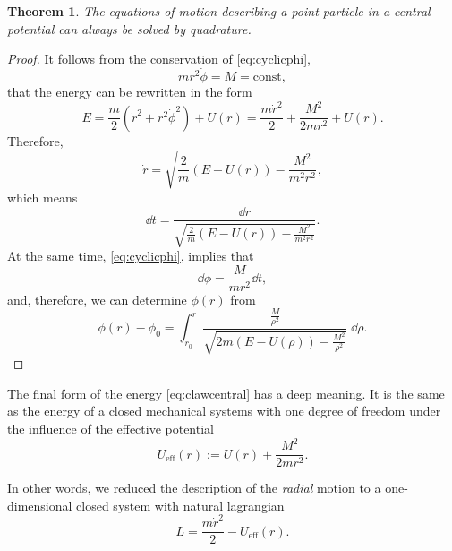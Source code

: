\documentclass[english,fontsize=11pt,paper=b5]{scrbook}
\numberwithin{equation}{chapter}
\newtheorem{theorem}{Theorem}[chapter]
\theoremstyle{definition}
\begin{document}
    \begin{theorem}
      The equations of motion describing a point particle in a central potential can always be solved by quadrature.
    \end{theorem}
    \begin{proof}
      It follows from the conservation of \eqref{eq:cyclicphi},
      \begin{equation}\label{eq:cyclicphi1}
        m r^2 \dot \phi = M = \mathrm{const},
      \end{equation}
      that the energy can be rewritten in the form
      \begin{equation}\label{eq:clawcentral}
        E = \frac m2 \left(\dot r^2 + r^2 \dot \phi^2\right) + U(r)
        = \frac {m \dot r^2}2 + \frac{M^2}{2m r^2} + U(r).
      \end{equation}
      Therefore,
      \begin{equation}
        \dot r = \sqrt{\frac2m(E-U(r)) - \frac{M^2}{m^2 r^2}},
      \end{equation}
      which means
      \begin{equation}\label{eq:timedep}
        \dd t = \frac{\dd r}{\sqrt{\frac2m(E-U(r)) - \frac{M^2}{m^2 r^2}}}.
      \end{equation}
      At the same time, \eqref{eq:cyclicphi}, implies that
      \begin{equation}
        \dd \phi = \frac{M}{m r^2} \dd t,
      \end{equation}
      and, therefore, we can determine $\phi(r)$ from
      \begin{equation}\label{eq:deltaphi}
        \phi(r) - \phi_0 =
        \int_{r_0}^r \frac{\frac{M}{\rho^2}}{\sqrt{2m(E-U(\rho)) - \frac{M^2}{\rho^2}}}\;\dd \rho.
      \end{equation}
    \end{proof}

    The final form of the energy \eqref{eq:clawcentral} has a deep meaning.
    It is the same as the energy of a closed mechanical systems with one degree of freedom under the influence of the effective potential
    \begin{equation}\label{eq:effpotcp}
      U_{\mathrm{eff}}(r) := U(r) + \frac{M^2}{2 m r^2}.
    \end{equation}

    In other words, we reduced the description of the \emph{radial} motion to a one-dimensional closed system with natural lagrangian
    \begin{equation}\label{eq:efflagcp}
      L = \frac{m \dot r^2}{2} - U_{\mathrm{eff}}(r).
    \end{equation}
\end{document}
